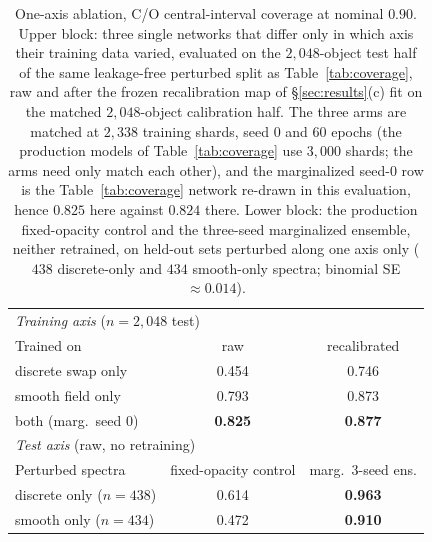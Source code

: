 \documentclass{article}
\begin{document}
\begin{table}[h]
\centering
\caption{One-axis ablation, C/O central-interval coverage at nominal $0.90$.
Upper block: three single networks that differ only in which axis their training
data varied, evaluated on the $2{,}048$-object test half of the same
leakage-free perturbed split as Table~\ref{tab:coverage}, raw and after the
frozen recalibration map of \S\ref{sec:results}(c) fit on the matched
$2{,}048$-object calibration half. The three arms are matched at $2{,}338$
training shards, seed 0 and 60 epochs (the production models of
Table~\ref{tab:coverage} use $3{,}000$ shards; the arms need only match each
other), and the marginalized seed-0 row is the Table~\ref{tab:coverage} network
re-drawn in this evaluation, hence $0.825$ here against $0.824$ there. Lower
block: the production fixed-opacity control and the three-seed marginalized
ensemble, neither retrained, on held-out sets perturbed along one axis only
($438$ discrete-only and $434$ smooth-only spectra; binomial SE
$\approx0.014$).}
\label{tab:ablation}
\begin{tabular}{lcc}
\toprule
\multicolumn{3}{l}{\emph{Training axis} ($n=2{,}048$ test)} \\
Trained on & raw & recalibrated \\
\midrule
discrete swap only        & 0.454 & 0.746 \\
smooth field only         & 0.793 & 0.873 \\
both (marg.\ seed 0)      & \textbf{0.825} & \textbf{0.877} \\
\midrule
\multicolumn{3}{l}{\emph{Test axis} (raw, no retraining)} \\
Perturbed spectra & fixed-opacity control & marg.\ 3-seed ens. \\
\midrule
discrete only ($n=438$)   & 0.614 & \textbf{0.963} \\
smooth only ($n=434$)     & 0.472 & \textbf{0.910} \\
\bottomrule
\end{tabular}
\end{table}
\end{document}

